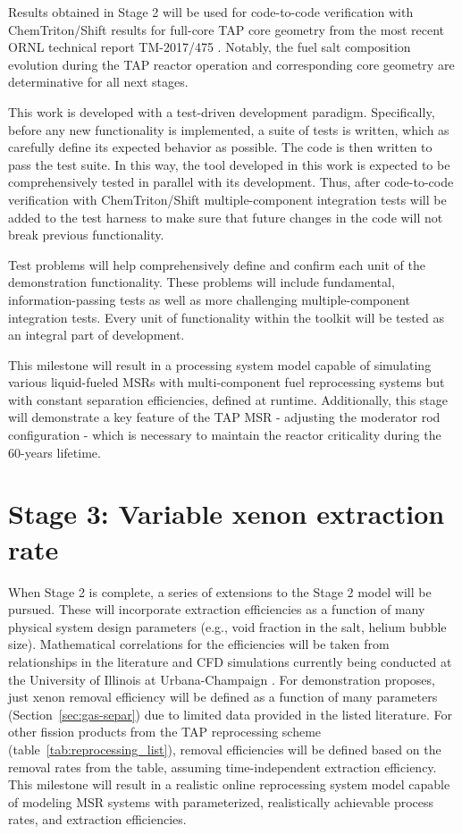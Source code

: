 Results obtained in Stage 2 will be used for code-to-code verification with  
ChemTriton/Shift results for full-core \gls{TAP} core geometry from the most 
recent \gls{ORNL} technical report TM-2017/475 \cite{betzler_assessment_2017}. 
Notably, the fuel salt composition evolution during the \gls{TAP} reactor 
operation and corresponding core geometry are determinative for all next 
stages.

This work is developed with a test-driven development paradigm. Specifically, 
before any new functionality is implemented, a suite of tests is written, 
which as carefully define its expected behavior as possible. The code is then 
written to pass the test suite. In this way, the tool developed in this work 
is expected to be comprehensively tested in parallel with its development. 
Thus, after code-to-code verification with ChemTriton/Shift multiple-component 
integration tests will be added to the test harness to make sure that future 
changes in the code will not break previous functionality.

Test problems will help comprehensively define and confirm each unit of the 
demonstration functionality. These problems will include fundamental, 
information-passing tests as well as more challenging multiple-component 
integration tests. Every unit of functionality within the toolkit will be 
tested as an integral part of development.

This milestone will result in a processing system model capable of simulating
various liquid-fueled \glspl{MSR} with multi-component fuel reprocessing 
systems but with constant separation efficiencies, defined at runtime. 
Additionally, this stage will demonstrate a key feature of the \gls{TAP} 
\gls{MSR} - adjusting the moderator rod configuration - which is necessary to 
maintain the reactor criticality during the 60-years lifetime. 

\section{Stage 3: Variable xenon extraction rate}
When Stage 2 is complete, a series of extensions to the Stage 2 model will 
be pursued. These will incorporate extraction efficiencies as a function of 
many physical system design parameters (e.g., void fraction in the salt, 
helium bubble size). Mathematical correlations for the efficiencies will be 
taken from relationships in the literature \cite{peebles_removal_1968, 
gabbard_development_1974} and CFD simulations currently being conducted 
at the University of Illinois at Urbana-Champaign \cite{huff_enabling_2018}. 
For demonstration proposes, just xenon removal efficiency will be defined as a 
function of many parameters (Section~\ref{sec:gas-separ}) due to 
limited data provided in the listed literature. For other fission products  
from the \gls{TAP} reprocessing scheme (table~\ref{tab:reprocessing_list}), 
removal efficiencies will be defined based on the removal rates from the 
table, assuming time-independent extraction efficiency. This milestone will 
result in a realistic online reprocessing system model capable of modeling 
\gls{MSR} systems with parameterized, realistically achievable process rates,  
and extraction efficiencies.

